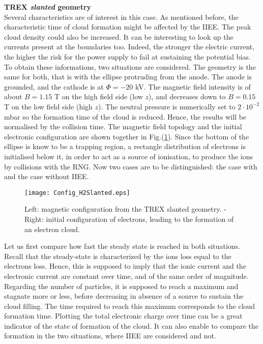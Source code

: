 \textbf{TREX \emph{slanted} geometry}\\

Several characteristics are of interest in this case. As mentioned before, the characteristic time of cloud formation might be affected by the IIEE. The peak cloud density could also be increased. It can be interesting to look up the currents present at the boundaries too. Indeed, the stronger the electric current, the higher the risk for the power supply to fail at sustaining the potential bias. To obtain these informations, two situations are considered. The geometry is the same for both, that is with the ellipse protruding from the anode. The anode is grounded, and the cathode is at $\Phi = -20$ kV. The magnetic field intensity is of about $B = 1.15$ T on the high field side (low $z$), and decreases down to $B=0.15$ T on the low field side (high $z$). The neutral pressure is numerically set to $2\cdot 10^{-2}$ mbar so the formation time of the cloud is reduced. Hence, the results will be normalised by the collision time. The magnetic field topology and the initial electronic configuration are shown together in Fig.(\ref{Config_mag_Slanted}). Since the bottom of the ellipse is know to be a trapping region, a rectangle distribution of electrons is initialised below it, in order to act as a source of ionisation, to produce the ions by collisions with the RNG. Now two cases are to be distinguished: the case with and the case without IIEE.\\

\begin{figure}[h!]
\centering
	\texttt{[image: Config\_H2Slanted.eps]}
	\caption{\label{Config_mag_Slanted} Left: magnetic configuration from the TREX slanted geometry. - Right: initial configuration of electrons, leading to the formation of an electron cloud.}
\end{figure}  


Let us first compare how fast the steady state is reached in both situations. Recall that the steady-state is characterized by the ions loss equal to the electrons loss. Hence, this is supposed to imply that the ionic current and the electronic current are constant over time, and of the same order of magnitude. Regarding the number of particles, it is supposed to reach a maximum and stagnate more or less, before decreasing in absence of a source to sustain the cloud filling. The time required to reach this maximum corresponds to the cloud formation time. Plotting the total electronic charge over time can be a great indicator of the state of formation of the cloud. It can also enable to compare the formation in the two situations, where IIEE are considered and not. \\

